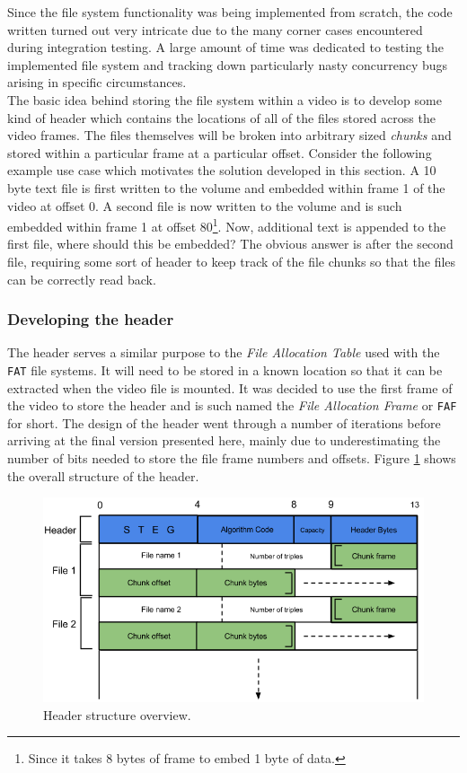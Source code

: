 \documentclass[paper=a4, fontsize=11pt,twoside]{scrartcl}    %
\numberwithin{table}{section}
\numberwithin{figure}{section}
\numberwithin{algorithm}{section}
\begin{document}
Since the file system functionality was being implemented from scratch, the code written turned out very intricate due to the many corner cases encountered during integration testing. A large amount of time was dedicated to testing the implemented file system and tracking down particularly nasty concurrency bugs arising in specific circumstances.\\

The basic idea behind storing the file system within a video is to develop some kind of header which contains the locations of all of the files stored across the video frames. The files themselves will be broken into arbitrary sized \textit{chunks} and stored within a particular frame at a particular offset. Consider the following example use case which motivates the solution developed in this section. A 10 byte text file is first written to the volume and embedded within frame 1 of the video at offset 0. A second file is now written to the volume and is such embedded within frame 1 at offset 80\footnote{Since it takes 8 bytes of frame to embed 1 byte of data.}. Now, additional text is appended to the first file, where should this be embedded? The obvious answer is after the second file, requiring some sort of header to keep track of the file chunks so that the files can be correctly read back.

\subsubsection{Developing the header}

The header serves a similar purpose to the \textit{File Allocation Table} used with the \texttt{FAT} file systems. It will need to be stored in a known location so that it can be extracted when the video file is mounted. It was decided to use the first frame of the video to store the header and is such named the \textit{File Allocation Frame} or \texttt{FAF} for short. The design of the header went through a number of iterations before arriving at the final version presented here, mainly due to underestimating the number of bits needed to store the file frame numbers and offsets. Figure \ref{header} shows the overall structure of the header.

\begin{figure}[!h]
\centerline{\includegraphics[width=\textwidth]{images/header.png}}
\caption{Header structure overview.}
\label{header}
\end{figure}
\end{document}
